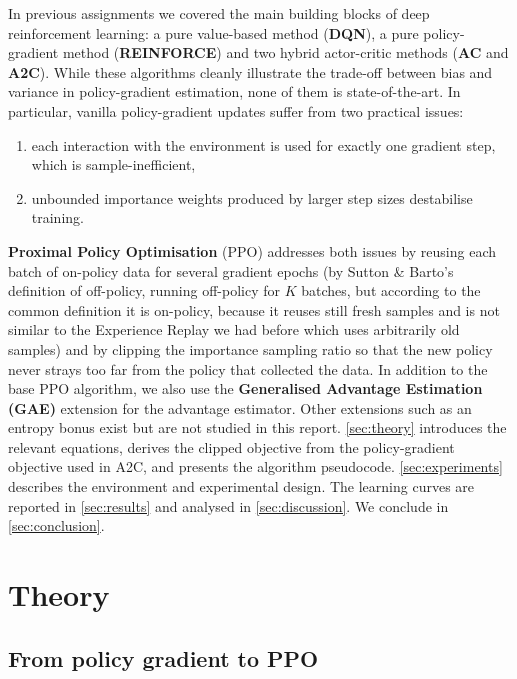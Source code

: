 \documentclass{article}
\theoremstyle{plain}
\theoremstyle{definition}
\theoremstyle{remark}
\begin{document}
In previous assignments we covered the main building blocks of deep reinforcement learning: a pure value-based method (\textbf{DQN}), a pure policy-gradient method (\textbf{REINFORCE}) and two hybrid actor-critic methods (\textbf{AC} and \textbf{A2C}). While these algorithms cleanly illustrate the trade-off between bias and variance in policy-gradient estimation, none of them is state-of-the-art. In particular, vanilla policy-gradient updates suffer from two practical issues:
\begin{enumerate}
    \item each interaction with the environment is used for exactly one gradient step, which is sample-inefficient,
    \item unbounded importance weights produced by larger step sizes destabilise training.
\end{enumerate}
\textbf{Proximal Policy Optimisation} (PPO) addresses both issues by reusing each batch of on-policy data for several gradient epochs (by Sutton \& Barto's definition of off-policy, running off-policy for $K$ batches, but according to the common definition it is on-policy, because it reuses still fresh samples and is not similar to the Experience Replay we had before which uses arbitrarily old samples) and by clipping the importance sampling ratio so that the new policy never strays too far from the policy that collected the data.
In addition to the base PPO algorithm, we also use the \textbf{Generalised Advantage Estimation (GAE)} \cite{schulman2016gae} extension for the advantage estimator. Other extensions such as an entropy bonus exist but are not studied in this report. \autoref{sec:theory} introduces the relevant equations, derives the clipped objective from the policy-gradient objective used in A2C, and presents the algorithm pseudocode. \autoref{sec:experiments} describes the environment and experimental design. The learning curves are reported in \autoref{sec:results} and analysed in \autoref{sec:discussion}. We conclude in \autoref{sec:conclusion}.

\section{Theory}\label{sec:theory}

\subsection{From policy gradient to PPO}\label{sec:theory:pg}
\end{document}
